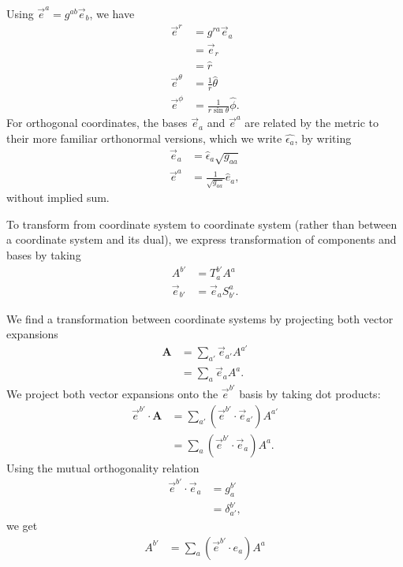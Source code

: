 \documentclass[10pt]{mypackage}
\begin{document}
\begin{example}
    Using $\vec{e}^{a} = g^{ab}\vec{e}_{b}$, we have
    \begin{align*}
      \vec{e}^{r} &= g^{ra}\vec{e}_{a}\\
                  &= \vec{e}_{r}\\
                  &= \hat{r}\\
      \vec{e}^{\theta} &= \frac{1}{r}\hat{\theta}\\
      \vec{e}^{\phi} &= \frac{1}{r\sin\theta}\hat{\phi}.
    \end{align*}
    For orthogonal coordinates, the bases $\vec{e}_{a}$ and $\vec{e}^{a}$ are related by the metric to their more familiar orthonormal versions, which we write $\hat{\epsilon_{a}}$, by writing
    \begin{align*}
      \vec{e}_{a} &= \hat{\epsilon}_{a}\sqrt{g_{aa}}\\
      \vec{e}^{a} &= \frac{1}{\sqrt{g_{aa}}}\hat{e}_{a},
    \end{align*}
    without implied sum.
  \end{example}
  To transform from coordinate system to coordinate system (rather than between a coordinate system and its dual), we express transformation of components and bases by taking
  \begin{align*}
    A^{b'} &= T_{a}^{b'}A^{a}\\
    \vec{e}_{b'} &= \vec{e}_{a}S^{a}_{b'}.
  \end{align*}
  \begin{example}
    We find a transformation between coordinate systems by projecting both vector expansions
    \begin{align*}
      \mathbf{A} &= \sum_{a'}\vec{e}_{a'}A^{a'}\\
        &= \sum_{a}\vec{e}_{a}A^{a}.
    \end{align*}
    We project both vector expansions onto the $\vec{e}^{b'}$ basis by taking dot products:
    \begin{align*}
      \vec{e}^{b'}\cdot \mathbf{A} &= \sum_{a'}\left( \vec{e}^{b'}\cdot \vec{e}_{a'} \right)A^{a'}\\
                                   &= \sum_{a}\left( \vec{e}^{b'}\cdot \vec{e}_{a} \right)A^{a}.
    \end{align*}
    Using the mutual orthogonality relation
    \begin{align*}
      \vec{e}^{b'} \cdot \vec{e}_{a} &= g_{a}^{b'}\\
                                     &= \delta_{a'}^{b'},
    \end{align*}
    we get
    \begin{align*}
      A^{b'} &= \sum_{a}\left( \vec{e}^{b'}\cdot e_a \right)A^{a}
    \end{align*}
  \end{example}
\end{document}

